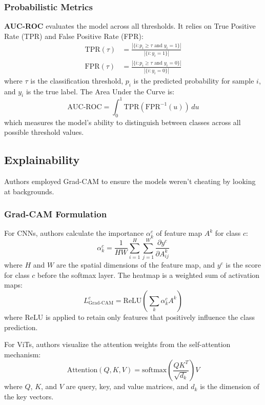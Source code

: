 \documentclass[conference]{IEEEtran}
\begin{document}
\subsubsection{Probabilistic Metrics}
\textbf{AUC-ROC} evaluates the model across all thresholds. It relies on True Positive Rate (TPR) and False Positive Rate (FPR):
\begin{align}
\text{TPR}(\tau) &= \frac{|\{i: p_i \geq \tau \text{ and } y_i = 1\}|}{|\{i: y_i = 1\}|} \\
\text{FPR}(\tau) &= \frac{|\{i: p_i \geq \tau \text{ and } y_i = 0\}|}{|\{i: y_i = 0\}|}
\label{eq:roc}
\end{align}
where $\tau$ is the classification threshold, $p_i$ is the predicted probability for sample $i$, and $y_i$ is the true label. The Area Under the Curve is:
\begin{equation}
\text{AUC-ROC} = \int_{0}^{1} \text{TPR}(\text{FPR}^{-1}(u)) \, du
\label{eq:auc_roc}
\end{equation}
which measures the model's ability to distinguish between classes across all possible threshold values.

\subsection{Explainability}
Authors employed Grad-CAM to ensure the models weren't cheating by looking at backgrounds.

\subsubsection{Grad-CAM Formulation}
For CNNs, authors calculate the importance $\alpha_k^c$ of feature map $A^k$ for class $c$:
\begin{equation}
\alpha_k^c = \frac{1}{HW}\sum_{i=1}^{H}\sum_{j=1}^{W}\frac{\partial y^c}{\partial A_{ij}^k}
\label{eq:gradcam_alpha}
\end{equation}
where $H$ and $W$ are the spatial dimensions of the feature map, and $y^c$ is the score for class $c$ before the softmax layer. The heatmap is a weighted sum of activation maps:
\begin{equation}
L_{\text{Grad-CAM}}^c = \text{ReLU}\left(\sum_{k} \alpha_k^c A^k\right)
\label{eq:gradcam_map}
\end{equation}
where ReLU is applied to retain only features that positively influence the class prediction.

For ViTs, authors visualize the attention weights from the self-attention mechanism:
\begin{equation}
\text{Attention}(Q, K, V) = \text{softmax}\left(\frac{QK^T}{\sqrt{d_k}}\right)V
\label{eq:attention}
\end{equation}
where $Q$, $K$, and $V$ are query, key, and value matrices, and $d_k$ is the dimension of the key vectors.
\end{document}
